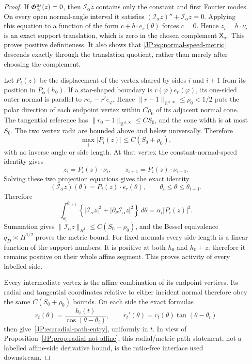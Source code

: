 \documentclass[11pt]{amsart}
\numberwithin{equation}{section}
\theoremstyle{definition}
\theoremstyle{remark}
\begin{document}
\begin{proof}
If $\mathfrak G_\alpha^{\rm ns}(z)=0$, then
$\mathcal I_\alpha z$ contains only the constant and first Fourier modes.
On every open normal-angle interval it satisfies
$(\mathcal I_\alpha z)''+\mathcal I_\alpha z=0$.  Applying this equation
to a function of the form $c+b\cdot e_r(\theta)$ forces $c=0$.  Hence
$z_i=b\cdot\nu_i$ is an exact support translation, which is zero in the
chosen complement $\mathsf X_\alpha$.  This proves positive definiteness.
It also shows that \eqref{JP:eq:normal-speed-metric} descends exactly through
the translation quotient, rather than merely after choosing the complement.

Let $P_i(z)$ be the displacement of the vertex shared by sides $i$ and
$i+1$ from its position in $P_\alpha(h_0)$.  If a star-shaped boundary is
$r(\varphi)e_r(\varphi)$, its one-sided outer normal is parallel to
$r e_r-r'e_\varphi$.  Hence $\|r-1\|_{W^{1,\infty}}\le\rho_0<1/2$
puts the polar direction of each endpoint vertex within $C\rho_0$ of
its adjacent normal cone.  The tangential reference has
$\|r_0-1\|_{W^{1,\infty}}\le CS_0$, and the cone width is at most $S_0$.
The two vertex radii are bounded above and below universally.  Therefore
\begin{equation}\label{JP:eq:vertex-displacement-radial}
 \max_i|P_i(z)|\le C(S_0+\rho_0),
\end{equation}
with no inverse angle or side length.  At that vertex the
constant-normal-speed identity gives
\[
 z_i=P_i(z)\cdot\nu_i,\qquad
 z_{i+1}=P_i(z)\cdot\nu_{i+1}.
\]
Solving these two projection equations gives the exact identity
\[
 (\mathcal I_\alpha z)(\theta)=P_i(z)\cdot e_r(\theta),
 \qquad \theta_i\le\theta\le\theta_{i+1}.
\]
Therefore
\[
 \int_{\theta_i}^{\theta_{i+1}}
 \left\{|\mathcal I_\alpha z|^2
       +|\partial_\theta\mathcal I_\alpha z|^2\right\}\,d\theta
 =\alpha_i|P_i(z)|^2.
\]
Summation gives
$\|\mathcal I_\alpha z\|_{H^1}\le C(S_0+\rho_0)$, and the
Bessel equivalence $q_D\asymp H^{1/2}$ proves the metric bound.  For fixed
normals every side length is a linear function of the support numbers.
It is positive at both $h_0$ and $h_0+z$; therefore it remains positive on
their whole affine segment.  This proves activity of every labelled side.

Every intermediate vertex is the affine combination of its endpoint
vertices.  Its radial and tangential coordinates relative to either
incident normal therefore obey the same $C(S_0+\rho_0)$ bounds.  On each
side the exact formulas
\[
 r_t(\theta)=\frac{h_i(t)}{\cos(\theta-\theta_i)},
 \qquad
 r_t'(\theta)=r_t(\theta)\tan(\theta-\theta_i)
\]
then give~\eqref{JP:eq:radial-path-entry}, uniformly in $t$.  In view of
Proposition~\ref{JP:prop:radial-not-affine}, this radial/metric path statement,
not a labelled affine-side derivative bound, is the ratio-free interface
used downstream.
\end{proof}
\end{document}

